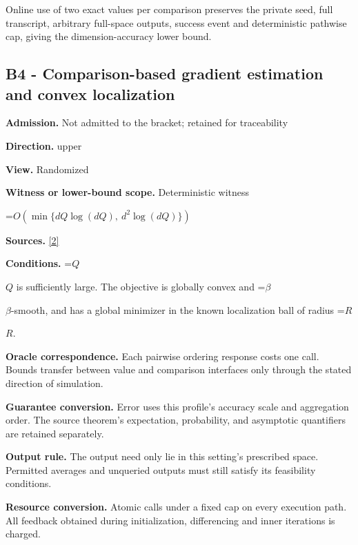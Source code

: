\documentclass[10pt,a4paper]{article}
\newcommand{\AtlasMath}[1]{\par\begingroup\centering\setbox0=\hbox{$\displaystyle #1$}\ifdim\wd0>1.4\linewidth\typeout{ATLAS WIDE FORMULA: \the\wd0}\fi\ifdim\wd0>\linewidth\resizebox{\linewidth}{!}{\box0}\else\box0\fi\par\endgroup}
\newcommand{\AtlasInlineMath}[1]{\begingroup\setbox0=\hbox{$#1$}\ifdim\wd0>.4\linewidth\endgroup\AtlasMath{#1}\else\endgroup$#1$\fi}
\begin{document}
Online use of two exact values per comparison preserves the private seed, full transcript, arbitrary full-space outputs, success event and deterministic pathwise cap, giving the dimension-accuracy lower bound.



\subsection{B4 - Comparison-based gradient estimation and convex localization}


\textbf{Admission.} Not admitted to the bracket; retained for traceability



\textbf{Direction.} upper



\textbf{View.} Randomized



\textbf{Witness or lower-bound scope.} Deterministic witness



\AtlasMath{O\!\left(\min\{dQ\log(dQ),\ d^2\log(dQ)\}\right)}


\textbf{Sources.} \href{https://arxiv.org/html/2405.11454v1}{[2]}



\textbf{Conditions.} \AtlasInlineMath{Q} is sufficiently large. The objective is globally convex and \AtlasInlineMath{\beta}-smooth, and has a global minimizer in the known localization ball of radius \AtlasInlineMath{R}.



\textbf{Oracle correspondence.} Each pairwise ordering response costs one call. Bounds transfer between value and comparison interfaces only through the stated direction of simulation.



\textbf{Guarantee conversion.} Error uses this profile's accuracy scale and aggregation order. The source theorem's expectation, probability, and asymptotic quantifiers are retained separately.



\textbf{Output rule.} The output need only lie in this setting's prescribed space. Permitted averages and unqueried outputs must still satisfy its feasibility conditions.



\textbf{Resource conversion.} Atomic calls under a fixed cap on every execution path. All feedback obtained during initialization, differencing and inner iterations is charged.
\end{document}
